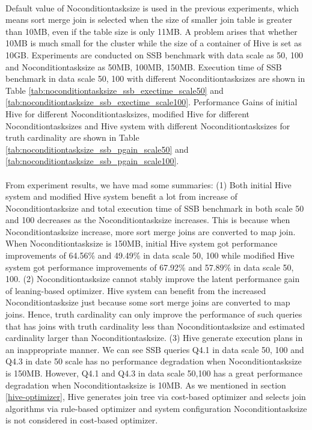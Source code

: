         \paragraph{}
        Default value of Noconditiontasksize is used in the previous experiments, which means sort merge join is selected when the size of smaller join table is greater
        than 10MB, even if the table size is only 11MB. A problem arises that whether 10MB is much small for the cluster while the size of a container of Hive is set 
        as 10GB. Experiments are conducted on SSB benchmark with data scale as 50, 100 and Noconditiontasksize as 50MB, 100MB, 150MB. Execution time of SSB benchmark 
        in data scale 50, 100 with different Noconditiontasksizes are shown in Table \ref{tab:noconditiontasksize_ssb_exectime_scale50} and 
        \ref{tab:noconditiontasksize_ssb_exectime_scale100}. Performance Gains of initial Hive for different Noconditiontasksizes, modified Hive for different 
        Noconditiontasksizes and Hive system with different Noconditiontasksizes for truth cardinality are shown in Table 
        \ref{tab:noconditiontasksize_ssb_pgain_scale50} and \ref{tab:noconditiontasksize_ssb_pgain_scale100}. 
        \paragraph{}
        From experiment results, we have mad some summaries:
        \newline{}
        (1) Both initial Hive system and modified Hive system benefit a lot from increase of Noconditiontasksize and total execution time of SSB benchmark in both 
        scale 50 and 100 decreases as the Noconditiontasksize increases. This is because when Noconditiontasksize increase, more sort merge joins are converted to 
        map join. When Noconditiontasksize is 150MB, initial Hive system got performance improvements of 64.56\% and 49.49\% in data scale 50, 100 while 
        modified Hive system got performance improvements of 67.92\% and 57.89\% in data scale 50, 100. 
        \newline{}
        (2) Noconditiontasksize cannot stably improve the latent performance gain of leaning-based optimizer. Hive system can benefit from the increased 
        Noconditiontasksize just because some sort merge joins are converted to map joins. Hence, truth cardinality can only improve the performance of
        such queries that has joins with truth cardinality less than Noconditiontasksize and estimated cardinality larger than Noconditiontasksize.
        \newline{}
        (3) Hive generate execution plans in an inappropriate manner. We can see SSB queries Q4.1 in data scale 50, 100 and Q4.3 in date 50 scale has no performance
        degradation when Noconditiontasksize is 150MB. However, Q4.1 and Q4.3 in data scale 50,100 has a great performance degradation when Noconditiontasksize is 10MB.
        As we mentioned in section \ref{hive-optimizer}, Hive generates join tree via cost-based optimizer and selects join algorithms via rule-based optimizer 
        and system configuration Noconditiontasksize is not considered in cost-based optimizer.
    
